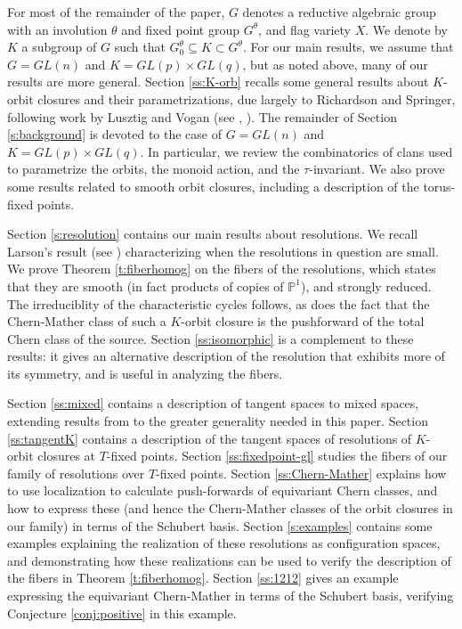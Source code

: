 \documentclass[11pt,letterpaper,reqno]{amsart}
\numberwithin{equation}{section}
\theoremstyle{plain}
\theoremstyle{definition}
\theoremstyle{remark}
\begin{document}
For most of the remainder of the paper, $G$ denotes a reductive algebraic group with an involution $\theta$
and fixed point group $G^{\theta}$, and flag variety $X$.  We denote by $K$ 
a subgroup of $G$ such that $G^{\theta}_0 \subseteq K \subset G^{\theta}$.
For our main results, we assume that $G = GL(n)$ and $K = GL(p) \times GL(q)$, but as noted
above, many of our results are more general.  Section \ref{ss:K-orb} recalls some general results about
$K$-orbit closures and their parametrizations, due largely to Richardson and Springer, following
work by Lusztig and Vogan (see \cite{RS90}, \cite{RS93}).  The remainder of
Section \ref{s:background} is devoted to the case of
$G = GL(n)$ and $K = GL(p) \times GL(q)$.  In particular, we review
the combinatorics of clans used to parametrize the orbits, the monoid action, and the
$\tau$-invariant.  We also prove some results related to smooth orbit closures, including a description of
the torus-fixed points.

Section \ref{s:resolution} contains our main results about resolutions.
We recall Larson's result (see \cite{Lar}) characterizing when the resolutions in question are small.
We prove Theorem \ref{t:fiberhomog} on the fibers of the resolutions, which states that they are
smooth (in fact products of copies of $\mathbb{P}^1$), and strongly reduced.  The irreduciblity
of the characteristic cycles follows, as does the fact that the Chern-Mather class of such
a $K$-orbit closure is the pushforward of the total Chern class of the source. Section \ref{ss:isomorphic} is a complement to
these results: it gives an alternative description of the resolution that exhibits more of its symmetry,
and is useful in analyzing the fibers.

Section \ref{ss:mixed} contains a description of tangent spaces to mixed spaces, extending
results from \cite{GZ} to the greater generality needed in this paper.  Section \ref{ss:tangentK} contains a description of the tangent spaces of resolutions
of $K$-orbit closures at $T$-fixed points.  Section \ref{ss:fixedpoint-gl} studies the fibers of 
our family of resolutions over $T$-fixed points.  Section \ref{ss:Chern-Mather} explains how to use
localization to calculate push-forwards of equivariant Chern classes, and how to express these (and hence
the Chern-Mather classes of the orbit closures in our family) in terms of the Schubert basis.
Section \ref{s:examples} contains some examples explaining the realization of these resolutions as
configuration spaces, and demonstrating how these realizations can be used to verify the description of the
fibers in Theorem \ref{t:fiberhomog}.  Section \ref{ss:1212} gives an example expressing the equivariant Chern-Mather
in terms of the Schubert basis, verifying Conjecture \ref{conj:positive} in this example.
\end{document}
